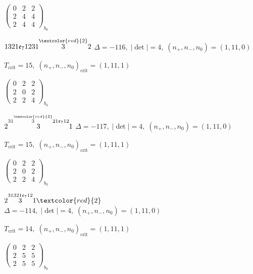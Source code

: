\documentclass[10pt]{article}
\begin{document}
\hspace{2em}$\left(\begin{smallmatrix}0 & 2 & 2 \\ 2 & 4 & 4 \\ 2 & 4 & 4\end{smallmatrix}\right)_{\!b_0}$

\smallskip

$1321\mathfrak{e}_71231\overset{\textcolor{red}{2}}{3}2$ \quad $\Delta=-116,\; |\det|=4,\; (n_+,n_-,n_0)=(1,11,0)$

\hspace{1em}$T_{\text{crit}}=15,\; (n_+,n_-,n_0)_{\text{crit}}=(1,11,1)$

\hspace{2em}$\left(\begin{smallmatrix}0 & 2 & 2 \\ 2 & 0 & 2 \\ 2 & 2 & 4\end{smallmatrix}\right)_{\!b_0}$

\smallskip

$2\overset{31\overset{\textcolor{red}{2}}{3}21\mathfrak{e}_712}{3}1$ \quad $\Delta=-117,\; |\det|=4,\; (n_+,n_-,n_0)=(1,11,0)$

\hspace{1em}$T_{\text{crit}}=15,\; (n_+,n_-,n_0)_{\text{crit}}=(1,11,1)$

\hspace{2em}$\left(\begin{smallmatrix}0 & 2 & 2 \\ 2 & 0 & 2 \\ 2 & 2 & 4\end{smallmatrix}\right)_{\!b_0}$

$2\overset{31321\mathfrak{e}_712}{3}1\textcolor{red}{2}$ \quad $\Delta=-114,\; |\det|=4,\; (n_+,n_-,n_0)=(1,11,0)$

\hspace{1em}$T_{\text{crit}}=14,\; (n_+,n_-,n_0)_{\text{crit}}=(1,11,1)$

\hspace{2em}$\left(\begin{smallmatrix}0 & 2 & 2 \\ 2 & 5 & 5 \\ 2 & 5 & 5\end{smallmatrix}\right)_{\!b_0}$

\smallskip
\end{document}
